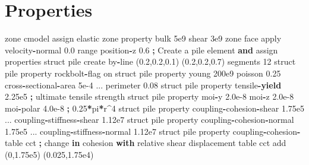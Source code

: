 \documentclass[a4paper, nobind]{templates/ociamthesis}
\newenvironment{Shaded}{\begin{snugshade}}{\end{snugshade}}
\newcommand{\BuiltInTok}[1]{#1}
\newcommand{\ControlFlowTok}[1]{\textcolor[rgb]{0.13,0.29,0.53}{\textbf{#1}}}
\newcommand{\DecValTok}[1]{\textcolor[rgb]{0.00,0.00,0.81}{#1}}
\newcommand{\FloatTok}[1]{\textcolor[rgb]{0.00,0.00,0.81}{#1}}
\newcommand{\KeywordTok}[1]{\textcolor[rgb]{0.13,0.29,0.53}{\textbf{#1}}}
\newcommand{\NormalTok}[1]{#1}
\newcommand{\OperatorTok}[1]{\textcolor[rgb]{0.81,0.36,0.00}{\textbf{#1}}}
\newcommand{\StringTok}[1]{\textcolor[rgb]{0.31,0.60,0.02}{#1}}
\renewenvironment{Shaded}
{
  \vspace{10pt}%
  \begin{snugshade}%
}{%
  \end{snugshade}%
  \vspace{8pt}%
}
\begin{document}
\hypertarget{properties-1}{%
\section{Properties}\label{properties-1}}

\begin{Shaded}
\begin{Highlighting}[]
\NormalTok{zone cmodel assign elastic}
\NormalTok{zone }\BuiltInTok{property}\NormalTok{ bulk }\FloatTok{5e9}\NormalTok{ shear }\FloatTok{3e9}
\NormalTok{zone face }\BuiltInTok{apply}\NormalTok{ velocity}\OperatorTok{{-}}\NormalTok{normal }\FloatTok{0.0} \BuiltInTok{range}\NormalTok{ position}\OperatorTok{{-}}\NormalTok{z }\FloatTok{0.6}
\OperatorTok{;}\NormalTok{ Create a pile element }\KeywordTok{and}\NormalTok{ assign properties}
\NormalTok{struct pile create by}\OperatorTok{{-}}\NormalTok{line (}\FloatTok{0.2}\NormalTok{,}\FloatTok{0.2}\NormalTok{,}\FloatTok{0.1}\NormalTok{) (}\FloatTok{0.2}\NormalTok{,}\FloatTok{0.2}\NormalTok{,}\FloatTok{0.7}\NormalTok{) segments }\DecValTok{12}
\NormalTok{struct pile }\BuiltInTok{property}\NormalTok{ rockbolt}\OperatorTok{{-}}\NormalTok{flag on}
\NormalTok{struct pile }\BuiltInTok{property}\NormalTok{ young }\FloatTok{200e9}\NormalTok{ poisson }\FloatTok{0.25}\NormalTok{ cross}\OperatorTok{{-}}\NormalTok{sectional}\OperatorTok{{-}}\NormalTok{area }\FloatTok{5e{-}4}\NormalTok{ ...}
\NormalTok{                     perimeter }\FloatTok{0.08}
\NormalTok{struct pile }\BuiltInTok{property}\NormalTok{ tensile}\OperatorTok{{-}}\ControlFlowTok{yield}   \FloatTok{2.25e5}  \OperatorTok{;}\NormalTok{ ultimate tensile strength}
\NormalTok{struct pile }\BuiltInTok{property}\NormalTok{ moi}\OperatorTok{{-}}\NormalTok{y }\FloatTok{2.0e{-}8}\NormalTok{ moi}\OperatorTok{{-}}\NormalTok{z }\FloatTok{2.0e{-}8}\NormalTok{ moi}\OperatorTok{{-}}\NormalTok{polar }\FloatTok{4.0e{-}8} \OperatorTok{;} \FloatTok{0.25}\OperatorTok{*}\NormalTok{pi}\OperatorTok{*}\NormalTok{r}\OperatorTok{\^{}}\DecValTok{4}
\NormalTok{struct pile }\BuiltInTok{property}\NormalTok{ coupling}\OperatorTok{{-}}\NormalTok{cohesion}\OperatorTok{{-}}\NormalTok{shear }\FloatTok{1.75e5}\NormalTok{ ...}
\NormalTok{                     coupling}\OperatorTok{{-}}\NormalTok{stiffness}\OperatorTok{{-}}\NormalTok{shear }\FloatTok{1.12e7}
\NormalTok{struct pile }\BuiltInTok{property}\NormalTok{ coupling}\OperatorTok{{-}}\NormalTok{cohesion}\OperatorTok{{-}}\NormalTok{normal }\FloatTok{1.75e5}\NormalTok{ ...}
\NormalTok{                     coupling}\OperatorTok{{-}}\NormalTok{stiffness}\OperatorTok{{-}}\NormalTok{normal }\FloatTok{1.12e7}
\NormalTok{struct pile }\BuiltInTok{property}\NormalTok{ coupling}\OperatorTok{{-}}\NormalTok{cohesion}\OperatorTok{{-}}\NormalTok{table }\StringTok{\textquotesingle{}cct\textquotesingle{}}
\OperatorTok{;}\NormalTok{ change }\KeywordTok{in}\NormalTok{ cohesion }\ControlFlowTok{with}\NormalTok{ relative shear displacement}
\NormalTok{table }\StringTok{\textquotesingle{}cct\textquotesingle{}}\NormalTok{ add (}\DecValTok{0}\NormalTok{,}\FloatTok{1.75e5}\NormalTok{) (}\FloatTok{0.025}\NormalTok{,}\FloatTok{1.75e4}\NormalTok{)}
\end{Highlighting}
\end{Shaded}
\end{document}
